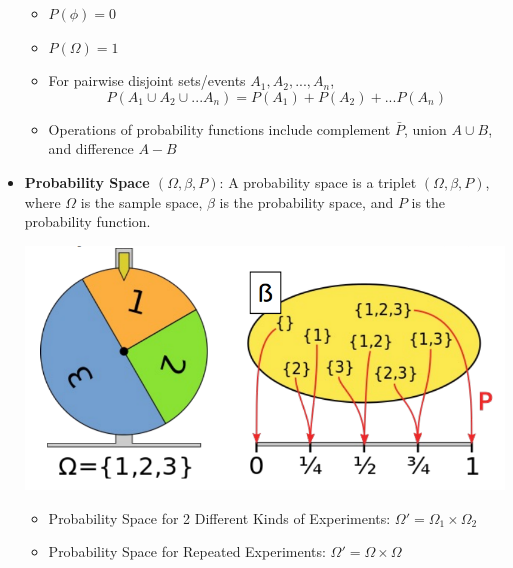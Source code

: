\documentclass{report}
\begin{document}
\begin{itemize}
\begin{itemize}
          \item $P(\phi) = 0$
          \item $P(\Omega) = 1$
          \item For pairwise disjoint sets/events $A_1,A_2,...,A_n$, $$P(A_1\cup A_2 \cup ... A_n) = P(A_1) + P(A_2) + ... P(A_n)$$
          \item Operations of probability functions include complement $\bar{P}$, union $A\cup B$, and difference $A-B$
        \end{itemize}
  \item \textbf{Probability Space $(\Omega,\beta,P)$}: A probability space is a triplet $(\Omega,\beta,P)$, where $\Omega$ is the sample space, $\beta$ is the probability space, and $P$ is the probability function.
        \begin{center}
          \includegraphics[scale=0.3]{"images/prob-01.png"}
        \end{center}
        \begin{itemize}
          \item Probability Space for 2 Different Kinds of Experiments: $\Omega' = \Omega_1 \times \Omega_2$
          \item Probability Space for Repeated Experiments: $\Omega' = \Omega \times \Omega$
        \end{itemize}
\end{itemize}
\end{document}

